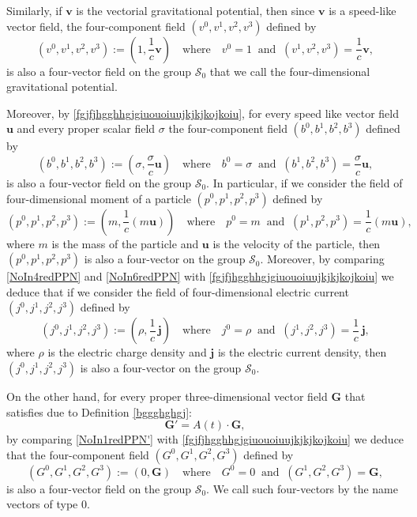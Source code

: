 \documentclass{article}
\theoremstyle{definition}
\theoremstyle{remark}
\renewcommand{\vec}[1]{\mathbf{#1}}
\newcommand{\er}{\eqref}
\newcommand{\er}{\eqref}
\begin{document}
 Similarly, if $\vec v$ is the vectorial gravitational
potential, then since $\vec v$ is a speed-like vector field, the
four-component field $(v^0,v^1,v^2,v^3)$ defined by
\begin{equation}\label{fgjfjhgghhgjghjhjijhojihjhjjijhjjjjjuiijjjk}
(v^0,v^1,v^2,v^3):=\left(1,\frac{1}{c}\vec
v\right)\quad\text{where}\quad
v^0=1\;\;\text{and}\;\;(v^1,v^2,v^3)=\frac{1}{c}\vec v,
\end{equation}
is also a four-vector field on the group $\mathcal{S}_0$ that we
call the four-dimensional gravitational potential.

Moreover, by \er{fgjfjhgghhgjgiuouoiuujkjkjkojkoiu}, for every speed
like vector field $\vec u$ and every proper scalar field $\sigma$
the four-component field $(b^0,b^1,b^2,b^3)$ defined by
\begin{equation}\label{fgjfjhgghhgjghjhjijhojihjhjjijhjjjjjuiijjjkl}
(b^0,b^1,b^2,b^3):=\left(\sigma,\frac{\sigma}{c}\vec
u\right)\quad\text{where}\quad
b^0=\sigma\;\;\text{and}\;\;(b^1,b^2,b^3)=\frac{\sigma}{c}\vec u,
\end{equation}
is also a four-vector field on the group $\mathcal{S}_0$. In
particular, if we consider the field of four-dimensional moment of a
particle $(p^0,p^1,p^2,p^3)$ defined by
\begin{equation}\label{fgjfjhgghhgjghjhjijhojihjhjjijhjjjjjuiijjjklihh}
(p^0,p^1,p^2,p^3):=\left(m,\frac{1}{c}(m\vec
u)\right)\quad\text{where}\quad
p^0=m\;\;\text{and}\;\;(p^1,p^2,p^3)=\frac{1}{c}(m\vec u),
\end{equation}
where $m$ is the mass of the particle and $\vec u$ is the velocity
of the particle, then $(p^0,p^1,p^2,p^3)$ is also a four-vector on
the group $\mathcal{S}_0$. Moreover, by comparing \er{NoIn4redPPN}
and \er{NoIn6redPPN} with \er{fgjfjhgghhgjgiuouoiuujkjkjkojkoiu} we
deduce that if we consider the field of four-dimensional electric
current $(j^0,j^1,j^2,j^3)$ defined by
\begin{equation}\label{fgjfjhgghhgjghjhjijhojihjhjjijhjjjjjuiijjjklihhojjjo}
(j^0,j^1,j^2,j^3):=\left(\rho,\frac{1}{c}\,\vec
j\right)\quad\text{where}\quad
j^0=\rho\;\;\text{and}\;\;(j^1,j^2,j^3)=\frac{1}{c}\,\vec j,
\end{equation}
where $\rho$ is the electric charge density and $\vec j$ is the
electric current density, then $(j^0,j^1,j^2,j^3)$ is also a
four-vector on the group $\mathcal{S}_0$.

On the other hand, for every proper three-dimensional vector field
$\vec G$ that satisfies due to Definition \ref{bggghghgj}:
\begin{equation}
\label{NoIn1redPPN'}\vec G'=A(t)\cdot\vec G,
\end{equation}
by comparing \er{NoIn1redPPN'} with
\er{fgjfjhgghhgjgiuouoiuujkjkjkojkoiu} we deduce that the
four-component field $(G^0,G^1,G^2,G^3)$ defined by
\begin{equation}\label{fgjfjhgghhgjghjhjijhojihjhjjijhjjjjjuiiklkllo;}
(G^0,G^1,G^2,G^3):=\left(0,\vec G\right)\quad\text{where}\quad
G^0=0\;\;\text{and}\;\;(G^1,G^2,G^3)=\vec G,
\end{equation}
is also a four-vector field on the group $\mathcal{S}_0$.  We call
such four-vectors by the name vectors of type $0$.
\end{document}
